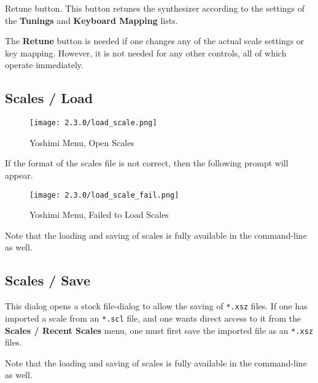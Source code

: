       Retune button.
      This button retunes the synthesizer according to the settings of
      the \textbf{Tunings} and \textbf{Keyboard Mapping} lists.

      The \textbf{Retune} button is needed if one
      changes any of the actual scale settings or key mapping. However, it is
      not needed for any other controls, all of which operate immediately.



\iffalse
   In the current version of \textsl{Yoshimi}, up to 25 recently used scales are
   now stored in the new history file
   (\texttt{yoshimi.history}), and can be quickly reinstalled with a
   mini-browser in exactly the same way as patch sets.
\fi
\subsection{Scales / Load}
\label{subsec:scales_load}

\begin{figure}[H]
   \centering
   \texttt{[image: 2.3.0/load\_scale.png]}
   \caption{Yoshimi Menu, Open Scales}
   \label{fig:yoshimi_open_scales}
\end{figure}

   If the format of the scales file is not correct, then the following prompt
   will appear.

\begin{figure}[H]
   \centering
   \texttt{[image: 2.3.0/load\_scale\_fail.png]}
   \caption{Yoshimi Menu, Failed to Load Scales}
   \label{fig:yoshimi_failed_to_load_scales}
\end{figure}

   Note that the loading and saving of scales is fully available in the
   command-line as well.

\subsection{Scales / Save}
\label{subsec:scales_save}

   This dialog opens a stock file-dialog to allow the saving of
   \texttt{*.xsz} files.
   If one has imported a scale from an \texttt{*.scl} file, and one
   wants direct access to it from the \textbf{Scales / Recent Scales} menu, one
   must first save the imported file as an \texttt{*.xsz} files.

   Note that the loading and saving of scales is fully available in the
   command-line as well.

